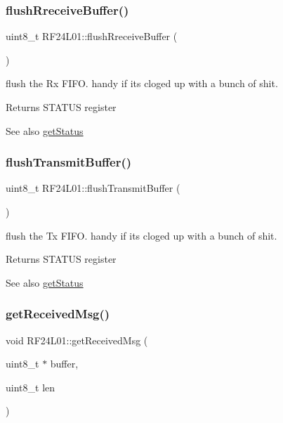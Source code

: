 \subsubsection{\texorpdfstring{flush\+Rreceive\+Buffer()}{flushRreceiveBuffer()}}
{\footnotesize\ttfamily uint8\+\_\+t R\+F24\+L01\+::flush\+Rreceive\+Buffer (\begin{DoxyParamCaption}{ }\end{DoxyParamCaption})}

flush the Rx F\+I\+FO. handy if its cloged up with a bunch of shit. \begin{DoxyReturn}{Returns}
S\+T\+A\+T\+US register 
\end{DoxyReturn}
\begin{DoxySeeAlso}{See also}
\mbox{\hyperlink{namespace_r_f24_l01_a37ae626e05545579eee5d81c88601c30}{get\+Status}} 
\end{DoxySeeAlso}
\mbox{\label{namespace_r_f24_l01_a531231a2006f852d63ba6d9ca3623f03}} 
\subsubsection{\texorpdfstring{flush\+Transmit\+Buffer()}{flushTransmitBuffer()}}
{\footnotesize\ttfamily uint8\+\_\+t R\+F24\+L01\+::flush\+Transmit\+Buffer (\begin{DoxyParamCaption}{ }\end{DoxyParamCaption})}

flush the Tx F\+I\+FO. handy if its cloged up with a bunch of shit. \begin{DoxyReturn}{Returns}
S\+T\+A\+T\+US register 
\end{DoxyReturn}
\begin{DoxySeeAlso}{See also}
\mbox{\hyperlink{namespace_r_f24_l01_a37ae626e05545579eee5d81c88601c30}{get\+Status}} 
\end{DoxySeeAlso}
\mbox{\label{namespace_r_f24_l01_af736b8bca2870b8cbf49fda37e1b2b7c}} 
\subsubsection{\texorpdfstring{get\+Received\+Msg()}{getReceivedMsg()}}
{\footnotesize\ttfamily void R\+F24\+L01\+::get\+Received\+Msg (\begin{DoxyParamCaption}\item[{uint8\+\_\+t $\ast$}]{buffer,  }\item[{uint8\+\_\+t}]{len }\end{DoxyParamCaption})}

